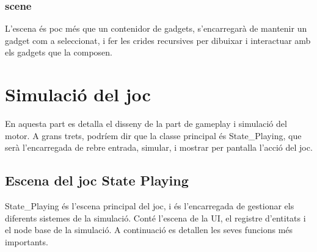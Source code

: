 \subsubsection{scene}
L'escena és poc més que un contenidor de gadgets, s'encarregarà de mantenir un gadget com a seleccionat, i fer les crides recursives per dibuixar i interactuar amb els gadgets que la composen.

\section{Simulació del joc}
En aquesta part es detalla el disseny de la part de gameplay i simulació del motor. A grans trets, podríem dir que la classe principal és State\_Playing, que serà l'encarregada de rebre entrada, simular, i mostrar per pantalla l'acció del joc.
\subsection{Escena del joc State Playing}
State\_Playing és l'escena principal del joc, i és l'encarregada de gestionar els diferents sistemes de la simulació. Conté l'escena de la UI, el registre d'entitats i el node base de la simulació. A continuació es detallen les seves funcions més importants.
